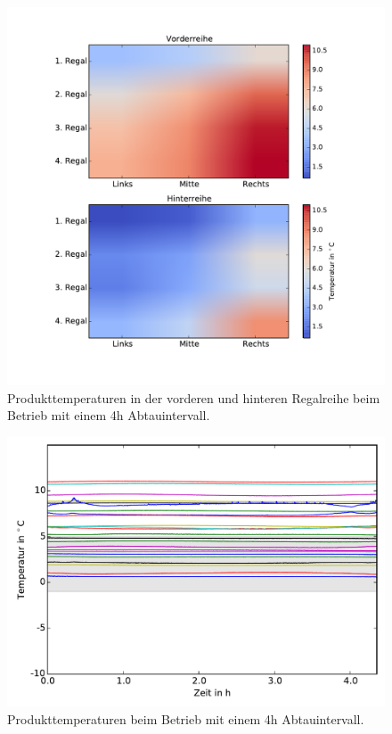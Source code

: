 \begin{figure}[h!]
\centering
\includegraphics[scale=0.8]{Pictures/50/load_colormap_lastCycle10perc.pdf}
\caption{Produkttemperaturen in der vorderen und hinteren Regalreihe beim Betrieb mit einem 4h Abtauintervall.}
\label{fig:prodtempmap50}
\end{figure}

\begin{figure}[h!]
\centering
\includegraphics[scale=0.8]{Pictures/50/ProductTemperature.pdf}
\caption{Produkttemperaturen beim Betrieb mit einem 4h Abtauintervall.}
\label{fig:prodtemp50}
\end{figure}


